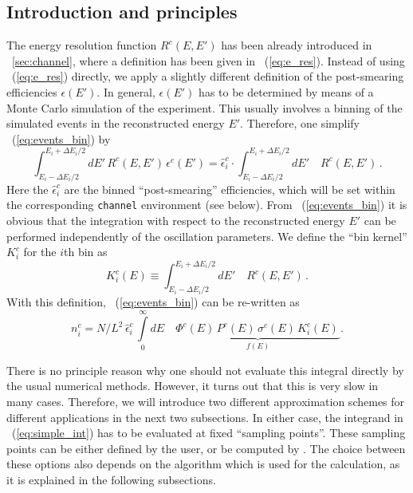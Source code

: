 \subsection{Introduction and principles}

The energy resolution function $R^c(E,E')$ has been already introduced in 
\Sec~\ref{sec:channel}, where a definition
has been given in \eq~(\ref{eq:e_res}). Instead of using
 \eq~(\ref{eq:e_res}) directly, we apply a slightly different
definition of the post-smearing efficiencies $\epsilon(E')$. 
In general, $\epsilon(E')$ has to be
determined by means of a Monte Carlo simulation of the experiment. 
This usually involves a binning of the simulated events in the 
reconstructed energy $E'$. Therefore, one simplify \eq~(\ref{eq:events_bin}) by
\begin{equation}
\label{eq:post_smearing}
\int_{E_i-\Delta E_i/2}^{E_i+\Delta E_i/2} dE' \, R^c(E,E') \, \epsilon^c(E') = \hat\epsilon_i^c \cdot \int_{E_i-\Delta E_i/2}^{E_i+\Delta E_i/2} dE' 
\quad R^c(E,E')\,.
\end{equation}
Here the  $\hat\epsilon_i^c$ are the 
binned ``post-smearing'' efficiencies, which will be set within the corresponding {\tt channel} environment (see below).
From \eq~(\ref{eq:events_bin}) it is obvious that the integration with respect to the reconstructed energy $E'$ can be
performed independently of the oscillation parameters. We define
the ``bin kernel'' $K_i^c$ for the $i$th bin as
\begin{equation}
\label{eq:kernel}
K_i^c(E) \equiv \int_{E_i-\Delta E_i/2}^{E_i+\Delta E_i/2} dE' 
\quad R^c(E,E')\,.
\end{equation}
With this definition, \eq~(\ref{eq:events_bin}) can be re-written as
\begin{equation}
\label{eq:simple_int}
n_i^c=N/L^2 \,
\hat\epsilon_i^c \, \int\limits_0^\infty dE\quad  \underbrace{\Phi^c(E)\,
P^c(E)\,
\sigma^c(E) \, K_i^c(E)\,}_{f(E)}. 
\end{equation}

There is no principle reason why one should not evaluate this integral directly by the usual numerical methods. However, it turns out that this 
is very slow in many cases. Therefore, we will introduce two different approximation schemes for different applications in the next two subsections.
In either case, the integrand in \eq~(\ref{eq:simple_int}) has to be evaluated at fixed ``sampling points''. These sampling points can be 
either defined by the user, or be computed by
\GLOBES . The choice between these options also depends on 
the algorithm which is used for the calculation, as it is explained in the following subsections. 

